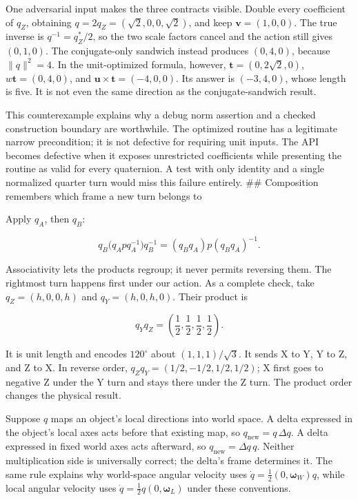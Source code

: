 One adversarial input makes the three contracts visible. Double every coefficient of \(q_Z\), obtaining \(q=2q_Z=(\sqrt2,0,0,\sqrt2)\), and keep \(\mathbf v=(1,0,0)\). The true inverse is \(q^{-1}=q_Z^*/2\), so the two scale factors cancel and the action still gives \((0,1,0)\). The conjugate-only sandwich instead produces \((0,4,0)\), because \(\|q\|^2=4\). In the unit-optimized formula, however, \(\mathbf t=(0,2\sqrt2,0)\), \(w\mathbf t=(0,4,0)\), and \(\mathbf u\times\mathbf t=(-4,0,0)\). Its answer is \((-3,4,0)\), whose length is five. It is not even the same direction as the conjugate-sandwich result.

This counterexample explains why a debug norm assertion and a checked construction boundary are worthwhile. The optimized routine has a legitimate narrow precondition; it is not defective for requiring unit inputs. The API becomes defective when it exposes unrestricted coefficients while presenting the routine as valid for every quaternion. A test with only identity and a single normalized quarter turn would miss this failure entirely. \#\# Composition remembers which frame a new turn belongs to

Apply \(q_A\), then \(q_B\):

\[
q_B\bigl(q_Apq_A^{-1}\bigr)q_B^{-1}
=(q_Bq_A)p(q_Bq_A)^{-1}.
\]

Associativity lets the products regroup; it never permits reversing them. The rightmost turn happens first under our action. As a complete check, take \(q_Z=(h,0,0,h)\) and \(q_Y=(h,0,h,0)\). Their product is

\[
q_Yq_Z=\left(\frac12,\frac12,\frac12,\frac12\right).
\]

It is unit length and encodes \(120^\circ\) about \((1,1,1)/\sqrt3\). It sends X to Y, Y to Z, and Z to X. In reverse order, \(q_Zq_Y=(1/2,-1/2,1/2,1/2)\); X first goes to negative Z under the Y turn and stays there under the Z turn. The product order changes the physical result.

Suppose \(q\) maps an object's local directions into world space. A delta expressed in the object's local axes acts before that existing map, so \(q_{\mathrm{new}}=q\,\Delta q\). A delta expressed in fixed world axes acts afterward, so \(q_{\mathrm{new}}=\Delta q\,q\). Neither multiplication side is universally correct; the delta's frame determines it. The same rule explains why world-space angular velocity uses \(\dot q=\tfrac12(0,\boldsymbol\omega_W)q\), while local angular velocity uses \(\dot q=\tfrac12q(0,\boldsymbol\omega_L)\) under these conventions.

